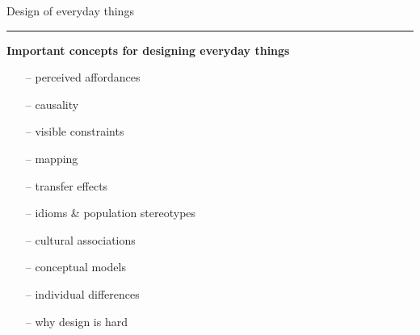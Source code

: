 \documentclass[pdf]{beamer}
\begin{document}
\begin{frame}
	{Design of everyday things}{\textcolor{red}{\rule{12cm}{1.2pt}}}

    \textbf{Important concepts for designing everyday things}
    
    \begin{itemize}
      \item [--]perceived affordances
      \item [--]causality
      \item [--]visible constraints
      \item [--]mapping
      \item [--]transfer effects
      \item [--]idioms \& population stereotypes
      \item [--]cultural associations
      \item [--]conceptual models
      \item [--]individual differences
      \item [--]why design is hard
    \end{itemize}
\end{frame}



\end{document}
